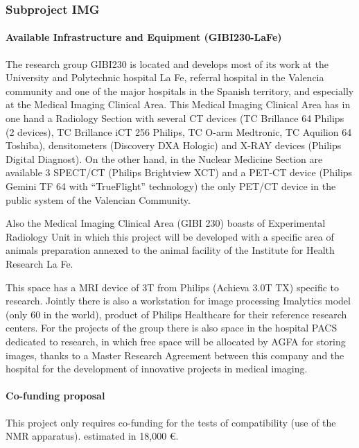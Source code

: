 \subsubsection*{Subproject IMG}
\paragraph{Available Infrastructure and Equipment (GIBI230-LaFe)}

The research group GIBI230 is located and develops most of its work at the University and Polytechnic hospital La Fe, referral hospital in the Valencia community and one of the major hospitals in the Spanish territory, and especially at the Medical Imaging Clinical Area. 
This Medical Imaging Clinical Area has in one hand a Radiology Section with several CT devices (TC Brillance 64 Philips (2 devices), TC Brillance iCT 256 Philips, TC O-arm
Medtronic, TC Aquilion 64 Toshiba), densitometers (Discovery DXA Hologic) and X-RAY devices (Philips Digital Diagnost). On the other hand, in the Nuclear Medicine Section are available 3 SPECT/CT (Philips Brightview XCT) and a PET-CT device (Philips Gemini TF 64 with “TrueFlight” technology) the only PET/CT device in the public system of the Valencian Community.

Also the Medical Imaging Clinical Area (GIBI 230) boasts of Experimental Radiology Unit in which this project will be developed with a specific area of animals preparation annexed to the animal facility of the Institute for Health Research La Fe.

This space has a MRI device of 3T from Philips (Achieva 3.0T TX) specific to research. Jointly there is also a workstation for image processing Imalytics model (only 60 in the world), product of Philips Healthcare for their reference research centers. For the projects of the group there is also space in the hospital PACS dedicated to research, in which free space will be allocated by AGFA for storing images, thanks to a Master Research Agreement between this company and the hospital for the development of innovative projects in medical imaging.

\paragraph{Co-funding proposal}
 This project only requires co-funding for the tests of compatibility (use of the NMR apparatus). estimated in 18,000 \euro. 
